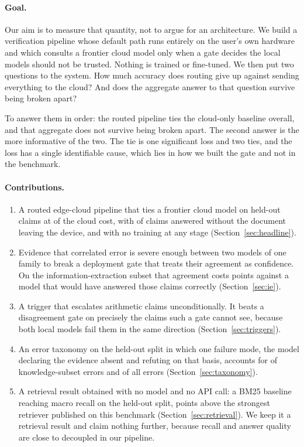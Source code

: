 \documentclass{article}
\begin{document}
\paragraph{Goal.}
Our aim is to measure that quantity, not to argue for an architecture. We build a
verification pipeline whose default path runs entirely on the user's own hardware and which
consults a frontier cloud model only when a gate decides the local models should not be
trusted. Nothing is trained or fine-tuned. We then put two questions to the system. How
much accuracy does routing give up against sending everything to the cloud? And does the
aggregate answer to that question survive being broken apart?

To answer them in order: the routed pipeline ties the cloud-only baseline overall, and that
aggregate does not survive being broken apart. The second answer is the more informative of
the two. The tie is one significant loss and two ties, and the loss has a single
identifiable cause, which lies in how we built the gate and not in the benchmark.

\paragraph{Contributions.}
\begin{enumerate}
\itemsep0pt
\item A routed edge-cloud pipeline that ties a frontier cloud model on \nTest{} held-out
claims at \costRatio{} of the cloud cost, with \onDeviceRate{} of claims answered without
the document leaving the device, and with no training at any stage
(Section~\ref{sec:headline}).
\item Evidence that correlated error \citep{kim2025correlated} is severe enough between two
models of one family to break a deployment gate that treats their agreement as confidence.
On the information-extraction subset that agreement costs \keptLocalIEGap{} points against a
model that would have answered those claims correctly (Section~\ref{sec:ie}).
\item A trigger that escalates arithmetic claims unconditionally. It beats a disagreement
gate on precisely the claims such a gate cannot see, because both local models fail them in
the same direction (Section~\ref{sec:triggers}).
\item An error taxonomy on the held-out split in which one failure mode, the model declaring
the evidence absent and refuting on that basis, accounts for \missingInfoKnowTest{} of
knowledge-subset errors and \missingInfoAllTest{} of all errors
(Section~\ref{sec:taxonomy}).
\item A retrieval result obtained with no model and no API call: a BM25 baseline reaching
\recallOursTest{} macro recall on the held-out split, \recallGainTest{} points above the
strongest retriever published on this benchmark (Section~\ref{sec:retrieval}). We keep it a
retrieval result and claim nothing further, because recall and answer quality are close to
decoupled in our pipeline.
\end{enumerate}
\end{document}
